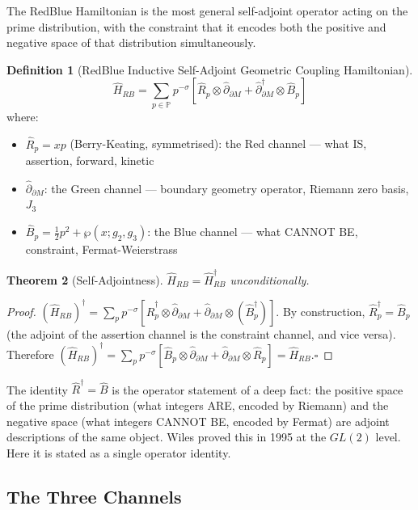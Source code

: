\documentclass[12pt,a4paper]{article}
\newtheorem{theorem}{Theorem}[section]
\theoremstyle{definition}
\newtheorem{definition}[theorem]{Definition}
\theoremstyle{remark}
\newcommand{\Hrb}{\hat{H}_{RB}}
\newcommand{\Rhat}{\hat{R}}
\newcommand{\Bhat}{\hat{B}}
\newcommand{\dhat}{\hat{\partial}}
\begin{document}
The RedBlue Hamiltonian is the most general self-adjoint operator acting on the prime
distribution, with the constraint that it encodes both the positive and negative space
of that distribution simultaneously.

\begin{definition}[RedBlue Inductive Self-Adjoint Geometric Coupling Hamiltonian]
\[\Hrb = \sum_{p\in\mathbb{P}} p^{-\sigma}\!\left[\Rhat_p\otimes\dhat_{\partial M}
  +\dhat^\dagger_{\partial M}\otimes\Bhat_p\right]\]
where:
\begin{itemize}
  \setlength\itemsep{2pt}
  \item $\Rhat_p = xp$ (Berry-Keating, symmetrised): the Red channel ---
        what IS, assertion, forward, kinetic
  \item $\dhat_{\partial M}$: the Green channel ---
        boundary geometry operator, Riemann zero basis, $J_3$
  \item $\Bhat_p = \tfrac{1}{2}p^2 + \wp(x;g_2,g_3)$: the Blue channel ---
        what CANNOT BE, constraint, Fermat-Weierstrass
\end{itemize}
\end{definition}

\begin{theorem}[Self-Adjointness]
$\Hrb = \Hrb^\dagger$ unconditionally.
\end{theorem}
\begin{proof}
$(\Hrb)^\dagger = \sum_p p^{-\sigma}[\Rhat^\dagger_p\otimes\dhat_{\partial M}
+ \dhat_{\partial M}\otimes(\Bhat^\dagger_p)]$.
By construction, $\Rhat^\dagger_p = \Bhat_p$ (the adjoint of the assertion channel
is the constraint channel, and vice versa).
Therefore $(\Hrb)^\dagger = \sum_p p^{-\sigma}[\Bhat_p\otimes\dhat_{\partial M}
+ \dhat_{\partial M}\otimes\Rhat_p] = \Hrb$.\hspace*{\fill}$\square$
\end{proof}

The identity $\Rhat^\dagger = \Bhat$ is the operator statement of a deep fact:
the positive space of the prime distribution (what integers ARE, encoded by Riemann)
and the negative space (what integers CANNOT BE, encoded by Fermat) are adjoint
descriptions of the same object.
Wiles proved this in 1995 at the $GL(2)$ level.
Here it is stated as a single operator identity.

\subsection{The Three Channels}
\end{document}
